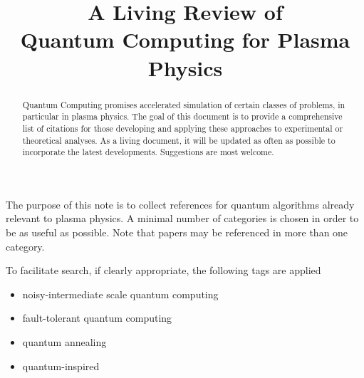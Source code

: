 \documentclass[12pt,letterpaper]{article}
\title{A Living Review of  \\  Quantum Computing for Plasma Physics}
\author{}
\date{}
\let\oldmaketitle\maketitle
\renewcommand\maketitle{{\bfseries\boldmath\oldmaketitle}}
\begin{document}
\maketitle


\begin{abstract}


	Quantum Computing promises accelerated simulation of certain classes of problems, in particular in plasma physics. The goal of this document is to provide a comprehensive list of citations for those developing and applying these approaches to experimental or theoretical analyses.  As a living document, it will be updated as often as possible to incorporate the latest developments. Suggestions are most welcome.

\end{abstract}

\newpage

The purpose of this note is to collect references for quantum algorithms already relevant to plasma physics.  A minimal number of categories is chosen in order to be as useful as possible. Note that papers may be referenced in more than one category.

To facilitate search, if clearly appropriate, the following tags are applied

 \begin{itemize}

    \item {} noisy-intermediate scale quantum computing

    \item {} fault-tolerant quantum computing

    \item {} quantum annealing

    \item {} quantum-inspired

 \end{itemize}
\end{document}
